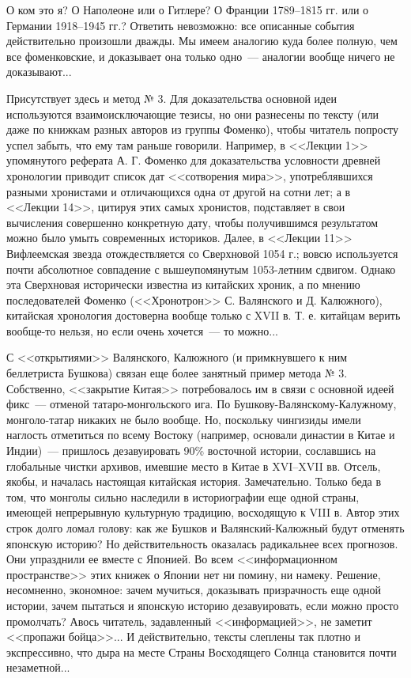 \documentclass{scrbook}
\newcommand{\flqq}{<<}
\newcommand{\frqq}{>>}
\newcommand{\mdash}{~--- }
\newcommand{\ndash}{--}
\begin{document}
О ком это я? О Наполеоне или о Гитлере? О Франции 1789{\ndash}1815 гг. или о Германии 1918{\ndash}1945 гг.? Ответить невозможно: все описанные события действительно произошли дважды. Мы имеем аналогию куда более полную, чем все фоменковские, и доказывает она только одно{\mdash}аналогии вообще ничего не доказывают...

Присутствует здесь и метод № 3. Для доказательства основной идеи используются взаимоисключающие тезисы, но они разнесены по тексту (или даже по книжкам разных авторов из группы Фоменко), чтобы читатель попросту успел забыть, что ему там раньше говорили. Например, в {\flqq}Лекции 1{\frqq} упомянутого реферата А. Г. Фоменко для доказательства условности древней хронологии приводит список дат {\flqq}сотворения мира{\frqq}, употреблявшихся разными хронистами и отличающихся одна от другой на сотни лет; а в {\flqq}Лекции 14{\frqq}, цитируя этих самых хронистов, подставляет в свои вычисления совершенно конкретную дату, чтобы получившимся результатом можно было умыть современных историков. Далее, в {\flqq}Лекции 11{\frqq} Вифлеемская звезда отождествляется со Сверхновой 1054 г.; вовсю используется почти абсолютное совпадение с вышеупомянутым 1053-летним сдвигом. Однако эта Сверхновая исторически известна из китайских хроник, а по мнению последователей Фоменко ({\flqq}Хронотрон{\frqq} С. Валянского и Д. Калюжного), китайская хронология достоверна вообще только с XVII в. Т. е. китайцам верить вообще-то нельзя, но если очень хочется{\mdash}то можно...

С {\flqq}открытиями{\frqq} Валянского, Калюжного (и примкнувшего к ним беллетриста Бушкова) связан еще более занятный пример метода № 3. Собственно, {\flqq}закрытие Китая{\frqq} потребовалось им в связи с основной идеей фикс{\mdash}отменой татаро-монгольского ига. По Бушкову-Валянскому-Калужному, монголо-татар никаких не было вообще. Но, поскольку чингизиды имели наглость отметиться по всему Востоку (например, основали династии в Китае и Индии){\mdash}пришлось дезавуировать 90\% восточной истории, сославшись на глобальные чистки архивов, имевшие место в Китае в XVI{\ndash}XVII вв. Отсель, якобы, и началась настоящая китайская история. Замечательно. Только беда в том, что монголы сильно наследили в историографии еще одной страны, имеющей непрерывную культурную традицию, восходящую к VIII в. Автор этих строк долго ломал голову: как же Бушков и Валянский-Калюжный будут отменять японскую историю? Но действительность оказалась радикальнее всех прогнозов. Они упразднили ее вместе с Японией. Во всем {\flqq}информационном пространстве{\frqq} этих книжек о Японии нет ни помину, ни намеку. Решение, несомненно, экономное: зачем мучиться, доказывать призрачность еще одной истории, зачем пытаться и японскую историю дезавуировать, если можно просто промолчать? Авось читатель, задавленный {\flqq}информацией{\frqq}, не заметит {\flqq}пропажи бойца{\frqq}... И действительно, тексты слеплены так плотно и экспрессивно, что дыра на месте Страны Восходящего Солнца становится почти незаметной...
\end{document}
